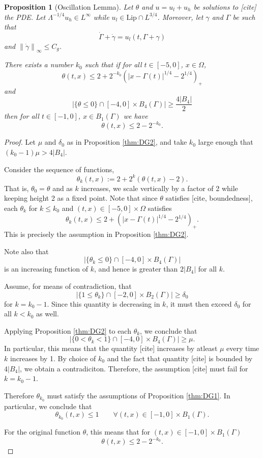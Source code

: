 \documentclass[11pt]{amsart}
\newtheorem{proposition}[theorem]{Proposition}
\theoremstyle{remark}
\theoremstyle{definition}
\newcommand{\norm}[1]{\left\lVert#1\right\rVert}
\newcommand{\paren}[1]{\left( #1 \right)}
\newcommand{\abs}[1]{\left\lvert #1 \right\rvert}
\newcommand{\Lip}{\text{Lip}}
\newcommand{\ulow}{u_l}
\newcommand{\uhigh}{u_h}
\newcommand{\Cgamma}{C_g}
\begin{document}
\begin{proposition}[Oscillation Lemma] \label{thm:oscillation general}
Let $\theta$ and $u = \ulow + \uhigh$ be solutions to [cite] the PDE.  Let $\Lambda^{-1/4} \uhigh \in L^\infty$ while $\ulow \in \Lip \cap L^{3/4}$.  Moreover, let $\gamma$ and $\Gamma$ be such that
\[ \dot{\Gamma} + \dot{\gamma} = \ulow(t,\Gamma+\gamma) \]
and $\norm{\dot{\gamma}}_\infty \leq \Cgamma$. 

There exists a number $k_0$ such that if for all $t \in [-5,0]$, $x \in \Omega$,
\[ \theta(t,x) \leq 2 + 2^{-k_0} \paren{|x-\Gamma(t)|^{1/4}-2^{1/4}}_+ \]
and
\[ \abs{\{\theta \leq 0\} \cap [-4,0]\times B_4(\Gamma)} \geq \frac{4|B_4|}{2} \]
then for all $t \in [-1,0]$, $x \in B_1(\Gamma)$ we have
\[ \theta(t,x) \leq 2 - 2^{-k_0}. \]
\end{proposition}

\begin{proof}
Let $\mu$ and $\delta_0$ as in Proposition \ref{thm:DG2}, and take $k_0$ large enough that $(k_0-1) \mu > 4 |B_4|$.  

Consider the sequence of functions,
\[ \theta_k(t,x) := 2 + 2^k (\theta(t,x) - 2). \]
That is, $\theta_0 = \theta$ and as $k$ increases, we scale vertically by a factor of 2 while keeping height 2 as a fixed point.  Note that since $\theta$ satisfies [cite, boundedness], each $\theta_k$ for $k \leq k_0$ and $(t,x) \in [-5,0] \times \Omega$ satisfies
\[ \theta_k(t,x) \leq 2 + \paren{|x-\Gamma(t)|^{1/4}-2^{1/4}}_+. \]
This is precisely the assumption in Proposition \ref{thm:DG2}.  

Note also that
\[ \abs{\{\theta_k \leq 0\} \cap [-4,0]\times B_4(\Gamma)} \]
is an increasing function of $k$, and hence is greater than $2|B_4|$ for all $k$.  

Assume, for means of contradiction, that
\[ \abs{\{1 \leq \theta_k \} \cap [-2,0]\times B_2(\Gamma)} \geq \delta_0 \]
for $k = k_0-1$.  Since this quantity is decreasing in $k$, it must then exceed $\delta_0$ for all $ k < k_0$ as well.  

Applying Proposition \ref{thm:DG2} to each $\theta_k$, we conclude that 
\[ \abs{\{0 < \theta_k < 1\} \cap [-4,0]\times B_4(\Gamma)} \geq \mu. \]
In particular, this means that the quantity [cite] increases by atleast $\mu$ every time $k$ increases by 1. By choice of $k_0$ and the fact that quantity [cite] is bounded by $4|B_4|$, we obtain a contradiciton.  Therefore, the assumption [cite] must fail for $k = k_0-1$.  

Therefore $\theta_{k_0}$ must satisfy the assumptions of Proposition \ref{thm:DG1}.  In particular, we conclude that
\[ \theta_{k_0}(t,x) \leq 1 \qquad \forall (t,x) \in [-1,0]\times B_1(\Gamma). \]

For the original function $\theta$, this means that for $(t,x) \in [-1,0] \times B_1(\Gamma)$
\[ \theta(t,x) \leq 2 - 2^{-k_0}. \]
\end{proof}
\end{document}
